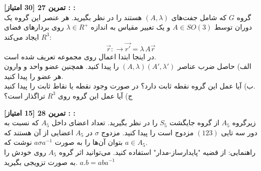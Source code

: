 \documentclass{article}
\newenvironment{exercise}[3][\unskip]{%
	\par
	\noindent
	\textbf{تمرین
		#1
		[#2 امتیاز] 
		\def\temp{#3}\ifx\temp\empty
		: 
		\else
		: #3 \vspace{0.5em} \\ \noindent
		\fi
}}{}
\begin{document}
\begin{exercise}[27]{30}{}
گروه 
$G$ 
که شامل 
جفت‌های 
$(A,\lambda)$ 
هستند را در نظر بگیرید. هر عنصر این گروه یک دوران توسط $A \in SO(3)$ 
و یک تغییر مقیاس به اندازه‌ 
$\lambda \in R^{+}$ 
روی بردارهای فضای 
$R^3$ 
ایجاد می‌کند:
\begin{equation*}
    \Vec{r}: \to \Vec{r'}=\lambda \, A\Vec{r}
\end{equation*}
در اینجا ابتدا اعمال روی مجموعه تعریف شده است.
\\
الف) حاصل ضرب عناصر 
$(A,\lambda)(A',\lambda')$ 
را پیدا کنید. همچنین عضو واحد و وارون هر عضو را پیدا کنید. 
\\
ب) آیا عمل این گروه نقطه ثابت دارد؟ در صورت وجود نقطه یا نقاط ثابت را پیدا کنید. 
\\
ج) آیا عمل این گروه روی 
$R^3$ 
تراگذار است؟ 


\end{exercise}

\begin{exercise}[28]{15}{}
زیرگروه 
$A_5$ 
از گروه جایگشت 
$S_5$ را در نظر بگیرید.
تعداد اعضای داخل 
$A_5$ 
که نسبت به دور سه تایی
$(123)$ 
مزدوج است را پیدا کنید. 
مزدوج 
$\sigma$ 
در 
$A_5$ 
اعضایی از آن هستند که بتوان آن‌ها را به صورت 
$a \sigma a^{-1}$ 
نوشت که 
$a \in A_5$.
\\
راهنمایی: از قضیه "پایدارساز-مدار" استفاده کنید. می‌توانید اثر گروه 
$A_5$ 
روی خودش را به صورت تزویجی بگیرید. 
$a.b=aba^{-1}$

\end{exercise}






\vspace{1em}
 
\end{document}
